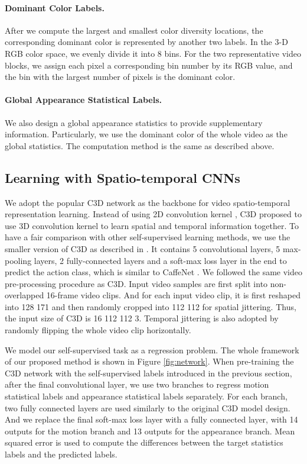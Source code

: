 \documentclass[10pt,twocolumn,letterpaper]{article}
\begin{document}
 
\vspace{-3mm}
\paragraph{Dominant Color Labels.} After we compute the largest and smallest color diversity locations, the corresponding dominant color is represented by another two labels. In the 3-D RGB color space, we evenly divide it into 8 bins. 
For the two representative video blocks, we assign each pixel a corresponding bin number by its RGB value, and the bin with the largest number of pixels is the dominant color.        


\vspace{-3mm}
\paragraph{Global Appearance Statistical Labels.} We also design a global appearance statistics to provide supplementary information. Particularly, we use the dominant color of the whole video as the global statistics. The computation method is the same as described above.  

\subsection{Learning with Spatio-temporal CNNs}\label{sec.learnc3d}
We adopt the popular C3D network \cite{tran2015learning} as the backbone for video spatio-temporal representation learning. Instead of using 2D convolution kernel , C3D proposed to use 3D convolution kernel   to learn spatial and temporal information together. To have a fair comparison with other self-supervised learning methods, we use the smaller version of C3D as described in \cite{tran2015learning}. It contains 5 convolutional layers, 5 max-pooling layers, 2 fully-connected layers and a soft-max loss layer in the end to predict the action class, which is similar to CaffeNet \cite{jia2014caffe}. We followed the same video pre-processing procedure as C3D. Input video samples are first split into non-overlapped 16-frame video clips.  And for each input video clip, it is first reshaped into 128  171 and then randomly cropped into 112  112 for spatial jittering. Thus, the input size of C3D is 16  112  112  3. Temporal jittering is also adopted by randomly flipping the whole video clip horizontally. 

We model our self-supervised task as a regression problem. The whole framework of our proposed method is shown in Figure \ref{fig:network}. When pre-training the C3D network with the self-supervised labels introduced in the previous section, after the final convolutional layer, we use two branches to regress motion statistical labels and appearance statistical labels separately. For each branch, two fully connected layers are used similarly to the original C3D model design. And we replace the final soft-max loss layer with a fully connected layer, with 14 outputs for the motion branch and 13 outputs for the appearance branch. Mean squared error is used to compute the differences between the target statistics labels and the predicted labels.
\end{document}
